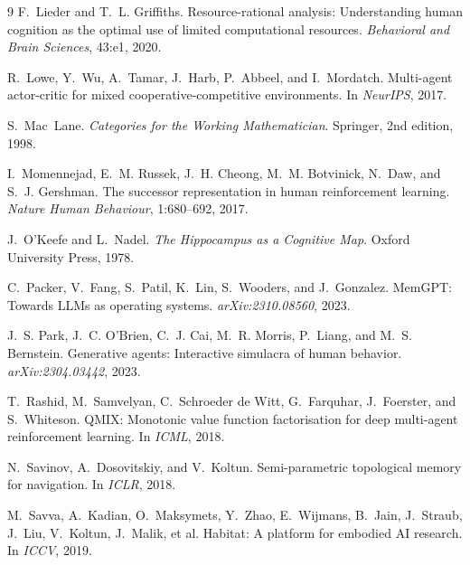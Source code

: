 \documentclass{article}
\begin{document}
{\begin{thebibliography}{9}
F.~Lieder and T.~L. Griffiths.
\newblock Resource-rational analysis: Understanding human cognition as the optimal use of limited computational resources.
\newblock \emph{Behavioral and Brain Sciences}, 43:e1, 2020.

R.~Lowe, Y.~Wu, A.~Tamar, J.~Harb, P.~Abbeel, and I.~Mordatch.
\newblock Multi-agent actor-critic for mixed cooperative-competitive environments.
\newblock In \emph{NeurIPS}, 2017.

S.~Mac~Lane.
\newblock \emph{Categories for the Working Mathematician}.
\newblock Springer, 2nd edition, 1998.

I.~Momennejad, E.~M. Russek, J.~H. Cheong, M.~M. Botvinick, N.~Daw, and S.~J. Gershman.
\newblock The successor representation in human reinforcement learning.
\newblock \emph{Nature Human Behaviour}, 1:680--692, 2017.

J.~O'Keefe and L.~Nadel.
\newblock \emph{The Hippocampus as a Cognitive Map}.
\newblock Oxford University Press, 1978.

C.~Packer, V.~Fang, S.~Patil, K.~Lin, S.~Wooders, and J.~Gonzalez.
\newblock MemGPT: Towards LLMs as operating systems.
\newblock \emph{arXiv:2310.08560}, 2023.

J.~S. Park, J.~C. O'Brien, C.~J. Cai, M.~R. Morris, P.~Liang, and M.~S. Bernstein.
\newblock Generative agents: Interactive simulacra of human behavior.
\newblock \emph{arXiv:2304.03442}, 2023.

T.~Rashid, M.~Samvelyan, C.~Schroeder de Witt, G.~Farquhar, J.~Foerster, and S.~Whiteson.
\newblock QMIX: Monotonic value function factorisation for deep multi-agent reinforcement learning.
\newblock In \emph{ICML}, 2018.

N.~Savinov, A.~Dosovitskiy, and V.~Koltun.
\newblock Semi-parametric topological memory for navigation.
\newblock In \emph{ICLR}, 2018.

M.~Savva, A.~Kadian, O.~Maksymets, Y.~Zhao, E.~Wijmans, B.~Jain, J.~Straub, J.~Liu, V.~Koltun, J.~Malik, et al.
\newblock Habitat: A platform for embodied AI research.
\newblock In \emph{ICCV}, 2019.


\end{thebibliography}}
\end{document}
